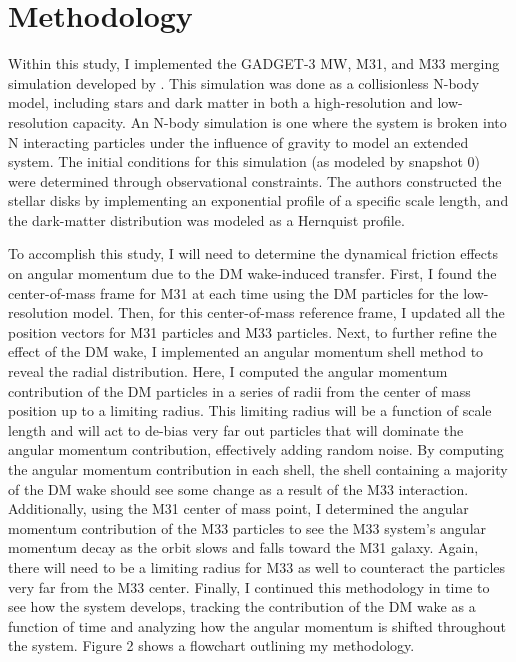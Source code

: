 \documentclass[fleqn,usenatbib]{mnras}
\begin{document}
\section{Methodology}  %

Within this study, I implemented the GADGET-3 MW, M31, and M33 merging simulation developed by \cite{vandermarel2012}. This simulation was done as a collisionless N-body model, including stars and dark matter in both a high-resolution and low-resolution capacity. An N-body simulation is one where the system is broken into N interacting particles under the influence of gravity to model an extended system. The initial conditions for this simulation (as modeled by snapshot 0) were determined through observational constraints. The authors constructed the stellar disks by implementing an exponential profile of a specific scale length, and the dark-matter distribution was modeled as a Hernquist profile. 

\vspace{10pt}

To accomplish this study, I will need to determine the dynamical friction effects on angular momentum due to the DM wake-induced transfer. First, I found the center-of-mass frame for M31 at each time using the DM particles for the low-resolution model. Then, for this center-of-mass reference frame, I updated all the position vectors for M31 particles and M33 particles. Next, to further refine the effect of the DM wake, I implemented an angular momentum shell method to reveal the radial distribution. Here, I computed the angular momentum contribution of the DM particles in a series of radii from the center of mass position up to a limiting radius. This limiting radius will be a function of scale length and will act to de-bias very far out particles that will dominate the angular momentum contribution, effectively adding random noise. By computing the angular momentum contribution in each shell, the shell containing a majority of the DM wake should see some change as a result of the M33 interaction. Additionally, using the M31 center of mass point, I determined the angular momentum contribution of the M33 particles to see the M33 system's angular momentum decay as the orbit slows and falls toward the M31 galaxy. Again, there will need to be a limiting radius for M33 as well to counteract the particles very far from the M33 center. Finally, I continued this methodology in time to see how the system develops, tracking the contribution of the DM wake as a function of time and analyzing how the angular momentum is shifted throughout the system. Figure 2 shows a flowchart outlining my methodology. 
\end{document}
